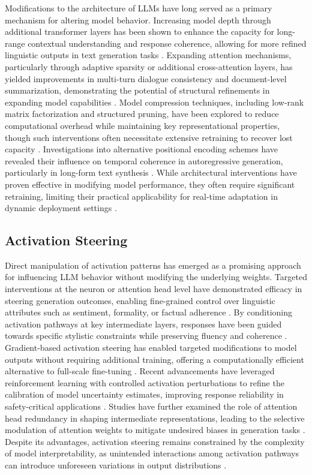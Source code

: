 \documentclass[5p,times]{elsarticle}
\begin{document}
Modifications to the architecture of LLMs have long served as a primary mechanism for altering model behavior. Increasing model depth through additional transformer layers has been shown to enhance the capacity for long-range contextual understanding and response coherence, allowing for more refined linguistic outputs in text generation tasks \cite{zablocki2024assessing}. Expanding attention mechanisms, particularly through adaptive sparsity or additional cross-attention layers, has yielded improvements in multi-turn dialogue consistency and document-level summarization, demonstrating the potential of structural refinements in expanding model capabilities \cite{fujiwara2024modify}. Model compression techniques, including low-rank matrix factorization and structured pruning, have been explored to reduce computational overhead while maintaining key representational properties, though such interventions often necessitate extensive retraining to recover lost capacity \cite{meibuki2024improving}. Investigations into alternative positional encoding schemes have revealed their influence on temporal coherence in autoregressive generation, particularly in long-form text synthesis \cite{alouris2024dynamic}. While architectural interventions have proven effective in modifying model performance, they often require significant retraining, limiting their practical applicability for real-time adaptation in dynamic deployment settings \cite{sione2024dynamic}.

\subsection{Activation Steering}

Direct manipulation of activation patterns has emerged as a promising approach for influencing LLM behavior without modifying the underlying weights. Targeted interventions at the neuron or attention head level have demonstrated efficacy in steering generation outcomes, enabling fine-grained control over linguistic attributes such as sentiment, formality, or factual adherence \cite{lodin2024dynamic}. By conditioning activation pathways at key intermediate layers, responses have been guided towards specific stylistic constraints while preserving fluency and coherence \cite{ kaufman2024dynamic}. Gradient-based activation steering has enabled targeted modifications to model outputs without requiring additional training, offering a computationally efficient alternative to full-scale fine-tuning \cite{wilson2024contextual}. Recent advancements have leveraged reinforcement learning with controlled activation perturbations to refine the calibration of model uncertainty estimates, improving response reliability in safety-critical applications \cite{cabeleireiro2024dynamic}. Studies have further examined the role of attention head redundancy in shaping intermediate representations, leading to the selective modulation of attention weights to mitigate undesired biases in generation tasks \cite{sawhai2024token}. Despite its advantages, activation steering remains constrained by the complexity of model interpretability, as unintended interactions among activation pathways can introduce unforeseen variations in output distributions \cite{ trissnow2024adaptive}.
\end{document}
